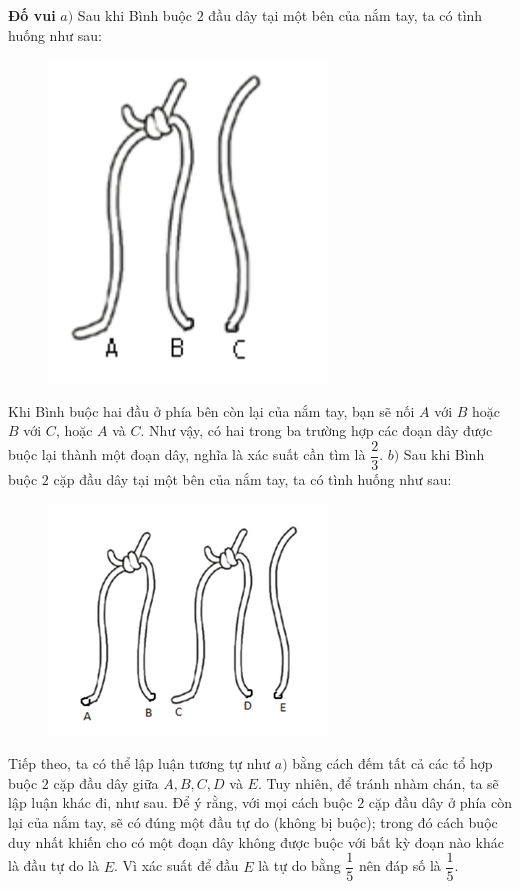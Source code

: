 \vspace*{-5pt}
\begin{multicols}{2}
	\textbf{\color{doisongtoanhoc}Đố vui}
	\vskip 0.1cm
	$a)$ Sau khi Bình buộc $2$ đầu dây tại một bên của nắm tay, ta có tình huống như sau:
	\begin{figure}[H]
		\vspace*{-10pt}
		\centering
		\captionsetup{labelformat= empty, justification=centering}
		\includegraphics[scale=0.3]{do_vui_1}
		\vspace*{-10pt}
	\end{figure}
	Khi Bình buộc hai đầu ở phía bên còn lại của nắm tay, bạn sẽ nối $A$ với $B$ hoặc $B $ với $C$, hoặc $A$ và $C$. Như vậy, có hai trong ba trường hợp các đoạn dây được buộc lại thành một đoạn dây, nghĩa là xác suất cần tìm là $\dfrac{2}{3}$.
	\vskip 0.1cm
	$b)$ Sau khi Bình buộc $2$ cặp đầu dây tại một bên của nắm tay, ta có tình huống như sau:
	\begin{figure}[H]
		\vspace*{-2pt}
		\centering
		\captionsetup{labelformat= empty, justification=centering}
		\includegraphics[scale=0.42]{do_vui_2}
		\vspace*{-10pt}
	\end{figure}
	Tiếp theo, ta có thể lập luận tương tự như $a)$ bằng cách đếm tất cả các tổ hợp buộc $2$ cặp đầu dây giữa $A, B, C, D$ và $E$. Tuy nhiên, để tránh nhàm chán, ta sẽ lập luận khác đi, như sau. Để ý rằng, với mọi cách buộc $2$ cặp đầu dây ở phía còn lại của nắm tay, sẽ có đúng một đầu tự do (không bị buộc); trong đó cách buộc duy nhất khiến cho có một đoạn dây không được buộc với bất kỳ đoạn nào khác là đầu tự do là $E$. Vì xác suất để đầu $E$ là tự do bằng $\dfrac{1}{5}$ nên đáp số là $\dfrac{1}{5}$.
	\vskip 0.1cm
	
\end{multicols}